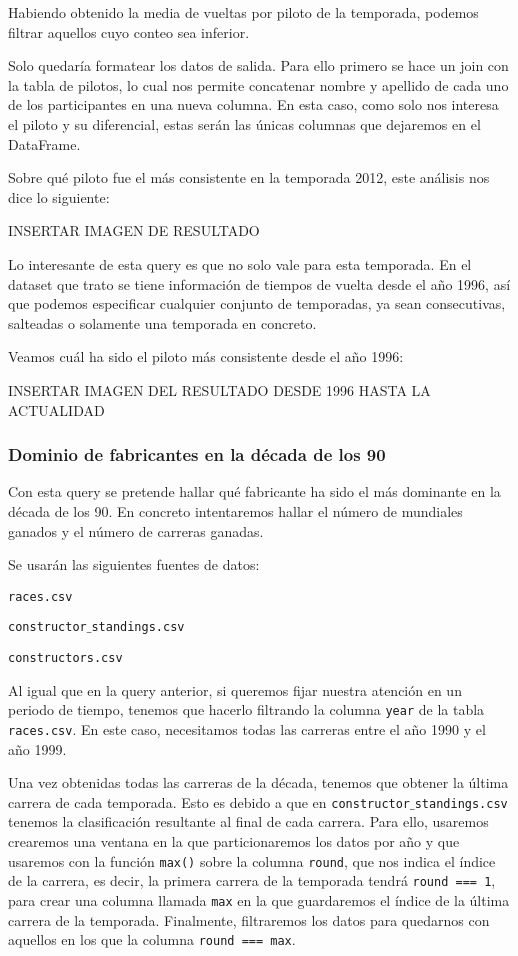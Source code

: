 \documentclass[12pt,twoside,titlepage]{report}
\begin{document}
Habiendo obtenido la media de vueltas por piloto de la temporada, podemos filtrar aquellos cuyo conteo sea inferior.


Solo quedaría formatear los datos de salida. Para ello primero se hace un join con la tabla de pilotos, lo cual nos permite concatenar nombre y apellido de cada uno de los participantes en una nueva columna. En esta caso, como solo nos interesa el piloto y su diferencial, estas serán las únicas columnas que dejaremos en el DataFrame.

Sobre qué piloto fue el más consistente en la temporada 2012, este análisis nos dice lo siguiente:

INSERTAR IMAGEN DE RESULTADO 

Lo interesante de esta query es que no solo vale para esta temporada. En el dataset que trato se tiene información de tiempos de vuelta desde el año 1996, así que podemos especificar cualquier conjunto de temporadas, ya sean consecutivas, salteadas o solamente una temporada en concreto.

Veamos cuál ha sido el piloto más consistente desde el año 1996:

INSERTAR IMAGEN DEL RESULTADO DESDE 1996 HASTA LA ACTUALIDAD


\subsubsection{Dominio de fabricantes en la década de los 90}

Con esta query se pretende hallar qué fabricante ha sido el más dominante en la década de los 90. En concreto intentaremos hallar el número de mundiales ganados y el número de carreras ganadas.

Se usarán las siguientes fuentes de datos:
\begin{compactitem}
  \item \texttt{races.csv}
  \item \texttt{constructor$\_$standings.csv}
  \item \texttt{constructors.csv}
\end{compactitem}

Al igual que en la query anterior, si queremos fijar nuestra atención en un periodo de tiempo, tenemos que hacerlo filtrando la columna \texttt{year} de la tabla \texttt{races.csv}. En este caso, necesitamos todas las carreras entre el año 1990 y el año 1999.

Una vez obtenidas todas las carreras de la década, tenemos que obtener la última carrera de cada temporada. Esto es debido a que en \newline\texttt{constructor$\_$standings.csv} tenemos la clasificación resultante al final de cada carrera. Para ello, usaremos crearemos una ventana en la que particionaremos los datos por año y que usaremos con la función \texttt{max()} sobre la columna \texttt{round}, que nos indica el índice de la carrera, es decir, la primera carrera de la temporada tendrá \texttt{round === 1}, para crear una columna llamada \texttt{max} en la que guardaremos el índice de la última carrera de la temporada. Finalmente, filtraremos los datos para quedarnos con aquellos en los que la columna \texttt{round === max}.
\end{document}
